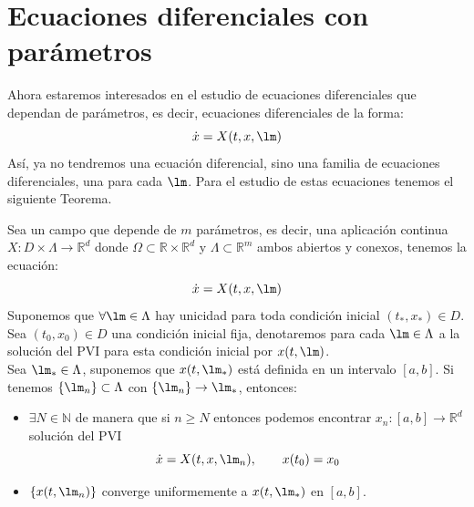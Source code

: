 \section{Ecuaciones diferenciales con parámetros}\label{sec:dep_parametros}
\noindent
Ahora estaremos interesados en el estudio de ecuaciones diferenciales que dependan de parámetros, es decir, ecuaciones diferenciales de la forma:
\begin{equation*}
    \dot{x} = X(t,x,\lm)
\end{equation*}
Así, ya no tendremos una ecuación diferencial, sino una familia de ecuaciones diferenciales, una para cada $\lm$. Para el estudio de estas ecuaciones tenemos el siguiente Teorema.

\begin{teo}
    Sea un campo que depende de $m$ parámetros, es decir, una aplicación continua $X:D\times\Lambda\to \mathbb{R}^d$ donde $\Omega\subset\mathbb{R}\times\mathbb{R}^d$ y $\Lambda\subset\mathbb{R}^m$ ambos abiertos y conexos, tenemos la ecuación:
    \begin{equation*}
        \dot{x} = X(t,x,\lm)
    \end{equation*}
    Suponemos que $\forall \lm\in \Lambda$ hay unicidad para toda condición inicial $(t_\ast,x_\ast)\in D$.\\

    \noindent
    Sea $(t_0,x_0)\in D$ una condición inicial fija, denotaremos para cada $\lm\in \Lambda$ a la solución del PVI para esta condición inicial por $x(t,\lm)$.\\

    \noindent
    Sea $\lm_\ast\in \Lambda$, suponemos que $x(t,\lm_\ast)$ está definida en un intervalo $[a,b]$. Si tenemos $\{\lm_n\}\subset\Lambda$ con $\{\lm_n\}\to \lm_\ast$, entonces:
    \begin{itemize}
        \item $\exists N\in \mathbb{N}$ de manera que si $n\geq N$ entonces podemos encontrar $x_n:[a,b]\to \mathbb{R}^d$ solución del PVI
            \begin{equation*}
                \dot{x}= X(t,x,\lm_n), \qquad x(t_0) = x_0
            \end{equation*}
        \item $\{x(t,\lm_n)\}$ converge uniformemente a $x(t,\lm_\ast)$ en $[a,b]$.
    \end{itemize}
\end{teo}

